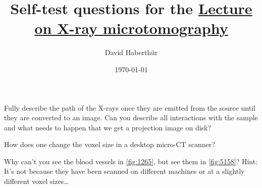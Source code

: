 \documentclass[a4paper]{exam}
\title{Self-test questions for the \href{https://ilias.unibe.ch/goto_ilias3_unibe_sess_1555744.html}{Lecture on X-ray microtomography}}
\author{David Haberthür}
\date{\today}
\begin{document}
\maketitle

\begin{questions}

\question Fully describe the path of the X-rays once they are emitted from the source until they are converted to an image.
	Can you describe all interactions with the sample and what needs to happen that we get a projection image on disk?

\question How does one change the voxel size in a desktop micro-CT scanner?

\question Why can't you see the blood vessels in \autoref{fig:1265}, but see them in \autoref{fig:5158}?
	Hint: It's not because they have been scanned on different machines or at a slightly different voxel sizes\ldots


\end{questions}
\end{document}
